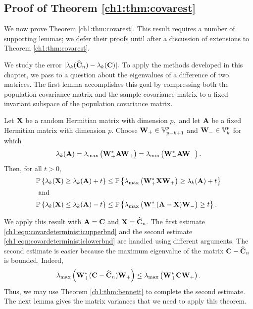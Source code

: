 \subsection{Proof of Theorem \ref{ch1:thm:covarest}}
We now prove Theorem \ref{ch1:thm:covarest}. This result requires a number of
supporting lemmas; we defer their proofs until after a discussion of extensions
to Theorem \ref{ch1:thm:covarest}.

We study the error $|\lambda_k(\widehat{\mathbf{C}}_n) - \lambda_k(\mathbf{C})|.$ To
apply the methods developed in this chapter, we pass to a question about the
eigenvalues of a difference of two matrices. The first lemma accomplishes this
goal by compressing both the population covariance matrix and the sample
covariance matrix to a fixed invariant subspace of the population covariance
matrix.

\begin{lemma}
\label{ch1:lemma:splittail}
Let $\mathbf{X}$ be a random Hermitian matrix with dimension $p,$ and let
$\mathbf{A}$ be a fixed Hermitian matrix with dimension $p$. Choose $\mathbf{W}_+
\in \mathbb{V}_{p-k+1}^{p}$ and $\mathbf{W}_- \in \mathbb{V}_{k}^{p}$ for which
\[
  \lambda_k(\mathbf{A}) = \lambda_{\mathrm{max}}\left(\mathbf{W}_+^*\mathbf{A}\mathbf{W}_+\right) =
\lambda_{\mathrm{min}}\left(\mathbf{W}_-^*\mathbf{A}\mathbf{W}_-\right).
\]
Then, for all $t >0,$
\begin{align}
 \mathbb{P}\left\{\lambda_k(\mathbf{X}) \geq \lambda_k(\mathbf{A}) + t\right\} & \leq
\mathbb{P}\left\{\lambda_{\mathrm{max}}\left(\mathbf{W}_+^* \mathbf{X} \mathbf{W}_+\right) \geq \lambda_k(\mathbf{A}) + t
\right\} \label{ch1:eqn:covardeterministicupperbnd}\\
\intertext{ and }
 \mathbb{P}\left\{\lambda_k(\mathbf{X}) \leq \lambda_k(\mathbf{A}) -t \right\} &\leq
\mathbb{P}\left\{\lambda_{\mathrm{max}}\left(\mathbf{W}_-^*(\mathbf{A} - \mathbf{X}) \mathbf{W}_-\right) \geq t\right\}.
 \label{ch1:eqn:covardeterministiclowerbnd}
\end{align}
\end{lemma}

We apply this result with $\mathbf{A} = \mathbf{C}$ and $\mathbf{X} =
\widehat{\mathbf{C}}_n.$ The first estimate \eqref{ch1:eqn:covardeterministicupperbnd}
and the second estimate \eqref{ch1:eqn:covardeterministiclowerbnd} are handled using
different arguments. The second estimate is easier because the maximum
eigenvalue of the matrix $\mathbf{C} - \widehat{\mathbf{C}}_n$ is bounded. Indeed,
\[
 \lambda_{\mathrm{max}}\left(\mathbf{W}_+^* (\mathbf{C} - \widehat{\mathbf{C}}_n) \mathbf{W}_+\right) \leq
\lambda_{\mathrm{max}}\left(\mathbf{W}_+^* \mathbf{C} \mathbf{W}_+\right).
\]
Thus, we may use Theorem \ref{ch1:thm:bennett} to complete the second estimate. The
next lemma gives the matrix variances that we need to apply this theorem.

